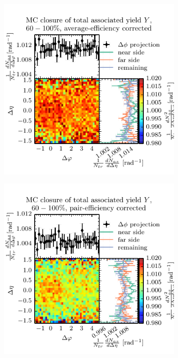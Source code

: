 \begin{figure}[htbp]
  \centering
  \begin{subfigure}[b]{0.5\textwidth}
    \includegraphics[width=\textwidth]{figures/closure_Y_peri_no_st.pdf}
  \end{subfigure}%
  \begin{subfigure}[b]{0.5\textwidth}
    \includegraphics[width=\textwidth]{figures/closure_Y_peri_st.pdf}

\end{subfigure}
\end{figure}
